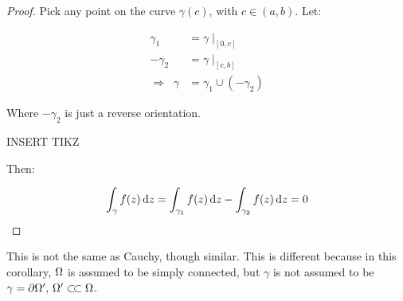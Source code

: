 \begin{proof}

Pick any point on the curve $\gamma(c)$, with $c \in (a,b)$. Let:

\begin{align*}
    \gamma_1 &= \gamma\mid_{[0,c]}\\
    -\gamma_2 &= \gamma\mid_{[c,b]}\\
    \Rightarrow \;\; \gamma &= \gamma_1 \cup (-\gamma_2)
\end{align*}

Where $- \gamma_2 $ is just a reverse orientation.

INSERT TIKZ

Then:

\begin{align*}
    \int_\gamma f(z) \dif z = \int_{\gamma_1} f(z) \dif z - \int_{\gamma_2} f(z) \dif z = 0
\end{align*}
\end{proof}

\begin{remark}
This is not the same as Cauchy, though similar. This is different because in this corollary, $\Omega$ is assumed to be simply connected, but $\gamma$ is not assumed to be $\gamma = \partial \om ', \, \om ' \ssubset \om$.
\end{remark}

